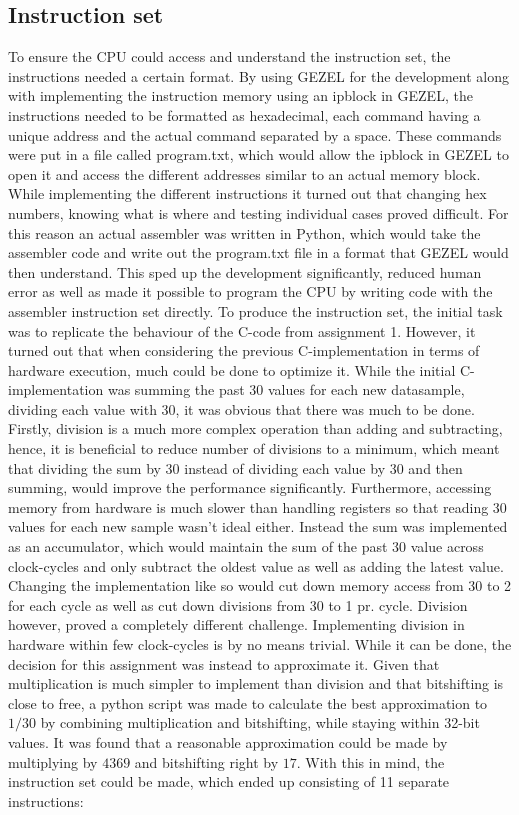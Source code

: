 \documentclass[12pt,a4paper]{article}
\begin{document}
\subsection{Instruction set}
	To ensure the CPU could access and understand the instruction set, the instructions needed a certain format. By using GEZEL for the development along with implementing the instruction memory using an ipblock in GEZEL, the instructions needed to be formatted as hexadecimal, each command having a unique address and the actual command separated by a space. These commands were put in a file called program.txt, which would allow the ipblock in GEZEL to open it and access the different addresses similar to an actual memory block.
	While implementing the different instructions it turned out that changing hex numbers, knowing what is where and testing individual cases proved difficult. For this reason an actual assembler was written in Python, which would take the assembler code and write out the program.txt file in a format that GEZEL would then understand. This sped up the development significantly, reduced human error as well as made it possible to program the CPU by writing code with the assembler instruction set directly.
	To produce the instruction set, the initial task was to replicate the behaviour of the C-code from assignment 1. However, it turned out that when considering the previous C-implementation in terms of hardware execution, much could be done to optimize it. While the initial C-implementation was summing the past 30 values for each new datasample, dividing each value with 30, it was obvious that there was much to be done.
	Firstly, division is a much more complex operation than adding and subtracting, hence, it is beneficial to reduce number of divisions to a minimum, which meant that dividing the sum by 30 instead of dividing each value by 30 and then summing, would improve the performance significantly. Furthermore, accessing memory from hardware is much slower than handling registers so that reading 30 values for each new sample wasn't ideal either. Instead the sum was implemented as an accumulator, which would maintain the sum of the past 30 value across clock-cycles and only subtract the oldest value as well as adding the latest value. Changing the implementation like so would cut down memory access from 30 to 2 for each cycle as well as cut down divisions from 30 to 1 pr. cycle. 
	Division however, proved a completely different challenge. Implementing division in hardware within few clock-cycles is by no means trivial. While it can be done, the decision for this assignment was instead to approximate it.
	Given that multiplication is much simpler to implement than division and that bitshifting is close to free, a python script was made to calculate the best approximation to $1/30$ by combining multiplication and bitshifting, while staying within 32-bit values.
	It was found that a reasonable approximation could be made by multiplying by $4369$ and bitshifting right by $17$. With this in mind, the instruction set could be made, which ended up consisting of 11 separate instructions:\\
	
\end{document}
